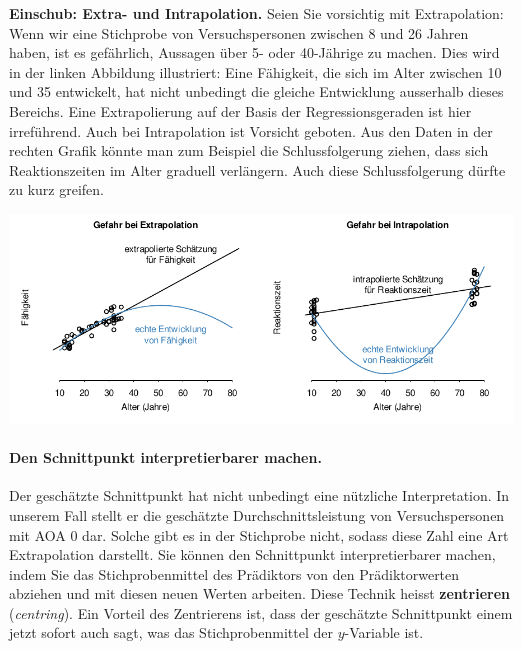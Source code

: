 \documentclass[oneside, 10pt]{book}\usepackage[]{graphicx}\usepackage[]{xcolor}
\newenvironment{knitrout}{}{} %
\begin{document}
\medskip

\begin{framed}
\noindent \textbf{Einschub: Extra- und Intrapolation.}
Seien Sie vorsichtig mit Extrapolation:
Wenn wir eine Stichprobe von Versuchspersonen zwischen
8 und 26 Jahren haben, ist es gefährlich, Aussagen über 5- oder 40-Jährige zu machen.
 Dies wird in der linken Abbildung illustriert:
 Eine Fähigkeit, die sich im Alter zwischen 10 und 35 entwickelt, hat nicht unbedingt die gleiche Entwicklung ausserhalb dieses Bereichs.
 Eine Extrapolierung auf der Basis der Regressionsgeraden ist hier irreführend.
 Auch bei Intrapolation ist Vorsicht geboten.
 Aus den Daten in der rechten Grafik könnte man zum Beispiel die Schlussfolgerung ziehen,
 dass sich Reaktionszeiten im Alter graduell verlängern.
 Auch diese Schlussfolgerung dürfte zu kurz greifen.

\begin{knitrout}
\color{fgcolor}

{\centering \includegraphics[width=.9\textwidth]{figs/unnamed-chunk-234-1} 

}


\end{knitrout}
\end{framed}

\medskip

\paragraph{Den Schnittpunkt interpretierbarer machen.}
Der geschätzte Schnittpunkt hat nicht unbedingt eine nützliche
Interpretation. In unserem Fall stellt er die geschätzte Durchschnittsleistung
von Versuchspersonen mit AOA 0 dar. Solche gibt es in der Stichprobe
nicht, sodass diese Zahl eine Art Extrapolation darstellt.
Sie können den Schnittpunkt interpretierbarer machen, indem
Sie das Stichprobenmittel des Prädiktors von den Prädiktorwerten
abziehen und mit diesen neuen Werten arbeiten.
Diese Technik heisst \textbf{zentrieren} (\textit{centring}).
Ein Vorteil des Zentrierens ist, dass der geschätzte Schnittpunkt
einem jetzt sofort auch sagt, was das Stichprobenmittel der $y$-Variable ist.
\end{document}
